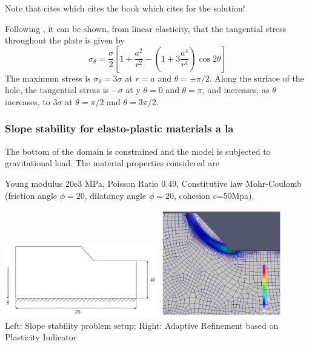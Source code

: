 Note that \cite{rama16} cites \cite{chnn10} which cites the book \cite[p772]{yobu02} 
which cites \cite{budynas} for the solution!

Following \cite{yobu02}, it can be shown, from linear elasticity, that the tangential
stress throughout the plate is given by
\[
\sigma_\theta = \frac{\sigma}{2} \left[ 1+\frac{a^2}{r^2} - \left( 1+3\frac{a^4}{r^4}  \right) \cos 2\theta   \right]
\]
The maximum stress is $\sigma_\theta=3\sigma$ at $r=a$ and $\theta=\pm \pi/2$. Along the surface of the hole, 
the tangential stress is $-\sigma$ at y $\theta=0$  and $\theta=\pi$, 
and increases, as $\theta$ increases, to $3\sigma$ at $\theta=\pi/2$ and $\theta=3\pi/2$.
 

\subsubsection{Slope stability for elasto-plastic materials a la \cite{rama16}}
\mscthesis {}

The bottom of the domain is constrained and the model is 
subjected to gravitational load. The material properties considered are

Young modulus 20e3 MPa, Poisson Ratio 0.49, Constitutive law Mohr-Coulomb 
(friction angle $\phi=20$\degree, 
dilatancy angle $\phi=20$\degree, cohesion $c$=50Mpa).

\begin{center}
\includegraphics[width=0.5\textwidth]{images/benchmark_slope/rama16c}
\includegraphics[width=0.4\textwidth]{images/benchmark_slope/rama16b}\\
{\scriptsize Left: Slope stability problem setup; Right: Adaptive Refinement based 
on Plasticity Indicator}
\end{center}


